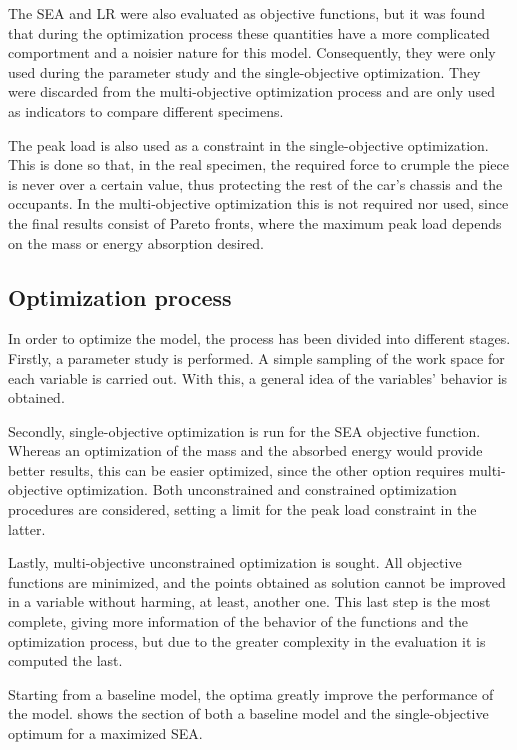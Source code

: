 \documentclass[cmfonts]{witpress}
\begin{document}
The SEA and LR were also evaluated as objective functions, but it was found that during the optimization process these quantities have a more complicated comportment and a noisier nature for this model. Consequently, they were only used during the parameter study and the single-objective optimization. They were discarded from the multi-objective  optimization process and are only used as indicators to compare different specimens.

The peak load is also used as a constraint in the single-objective optimization. This is done so that, in the real specimen, the required force to crumple the piece is never over a certain value, thus protecting the rest of the car's chassis and the occupants. In the multi-objective optimization this is not required nor used, since the final results consist of Pareto fronts, where the maximum peak load depends on the mass or energy absorption desired.

\subsection{Optimization process}

In order to optimize the model, the process has been divided into different stages. Firstly, a parameter study is performed. A simple sampling of the work space for each variable is carried out. With this, a general idea of the variables' behavior is obtained.

Secondly, single-objective optimization is run for the SEA objective function. Whereas an optimization of the mass and the absorbed energy would provide better results, this can be easier optimized, since the other option requires multi-objective optimization. Both unconstrained and constrained optimization procedures are considered, setting a limit for the peak load constraint in the latter.

Lastly, multi-objective unconstrained optimization is sought. All objective functions are minimized, and the points obtained as solution cannot be improved in a variable without harming, at least, another one. This last step is the most complete, giving more information of the behavior of the functions and the optimization process, but due to the greater complexity in the evaluation it is computed the last.

Starting from a baseline model, the optima greatly improve the performance of the model.  shows the section of both a baseline model and the single-objective optimum for a maximized SEA. 
\end{document}
